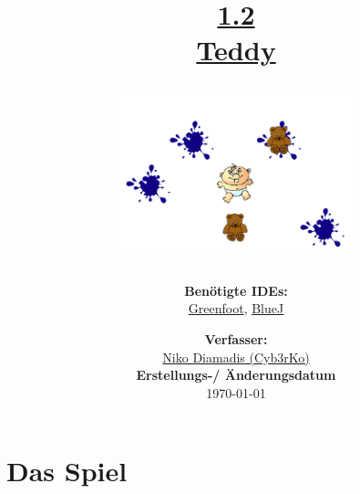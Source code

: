 \documentclass{scrartcl}   %
\begin{document}
\title{\huge{\href{https://www.inf-schule.de/oop/java/klassen/aufbau}{1.2\\Teddy}}\\
\vspace{0.5cm}
\begin{figure}[ht]
	\centering
	\includegraphics[height=4.5cm]{Teddy.png}
\end{figure}
\vspace{0.7cm}}

\author{\textbf{Benötigte IDEs:}\\
\href{https://www.greenfoot.org/}{Greenfoot}, \href{https://www.bluej.org/}{BlueJ}
\vspace{1cm}}

\date{\textbf{Verfasser:}\\
\href{https://cyb3rko.de}{Niko Diamadis (Cyb3rKo)}\\
\vspace{1cm}
\textbf{Erstellungs-/ Änderungsdatum}\\
\today\enlargethispage{4cm}}

\doublespacing

\maketitle\thispagestyle{empty}

\cleardoublepage

\setcounter{page}{1}
\tableofcontents


\newpage
{}  %

\cleardoublepage

\section{Das Spiel}
\end{document}
